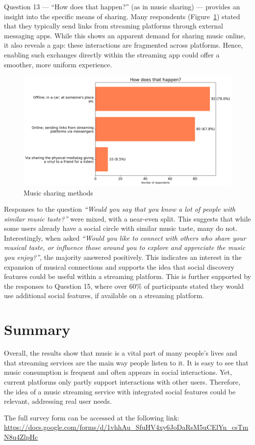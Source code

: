 Question 13 — “How does that happen?” (as in music sharing) — provides an insight into the specific means of sharing.
Many respondents (Figure~\ref{fig:sharemeth}) stated that they typically send links from streaming platforms through external messaging apps.
While this shows an apparent demand for sharing music online, it also reveals a gap: these interactions are fragmented across platforms.
Hence, enabling such exchanges directly within the streaming app could offer a smoother, more uniform experience.

\begin{figure}[htbp]
    \centering
    \includegraphics[height=0.4\textheight]{charts/share method.png}
    \caption{Music sharing methods}
    \label{fig:sharemeth}
\end{figure}

Responses to the question \textit{“Would you say that you know a lot of people with similar music taste?”} were mixed,
with a near-even split.
This suggests that while some users already have a social circle with similar music taste, many do not.
Interestingly, when asked
\textit{“Would you like to connect with others who share your musical taste, or influence those around you to explore and appreciate the music you enjoy?”},
the majority answered positively.
This indicates an interest in the expansion of musical connections and supports the idea that social discovery
features could be useful within a streaming platform.
This is further supported by the responses to Question 15, where over 60\% of participants stated they would use
additional social features, if available on a streaming platform.


\section{Summary}
Overall, the results show that music is a vital part of many people's lives
and that streaming services are the main way people listen to it.
It is easy to see that music consumption is frequent and often appears in social interactions.
Yet, current platforms only partly support interactions with other users.
Therefore, the idea of a music streaming service with integrated social features could be relevant,
addressing real user needs.

The full survey form can be accessed at the following link: \\
\url{https://docs.google.com/forms/d/1vhhAu_SfuHV4xy6JoDaRsM5uCElYn_csTmN8u4ZlpHc}